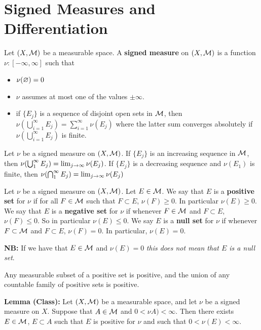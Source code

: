 \newpage
\section{Signed Measures and Differentiation}


\dfn Let $(X, \mathcal{M})$ be a measurable space. A \textbf{signed measure} on $(X, \mathcal{M})$ is a function $\nu: [-\infty, \infty]$ such that
\begin{itemize}
    \item $\nu(\varnothing) = 0$
    \item $\nu$ assumes at most one of the values $\pm\infty$.
    \item if $\{E_j\}$ is a sequence of disjoint open sets in $\mathcal{M}$, then $\nu(\bigcup_{i = 1}^\infty E_j) = \sum_{i = 1}^\infty \nu(E_j)$ where the latter sum converges absolutely if $\nu(\bigcup_{i = 1}^\infty E_j)$ is finite.
\end{itemize}

\vs

\begin{prop}
Let $\nu$ be a signed measure on $(X, \mathcal{M})$. If $\{E_j\}$ is an increasing sequence in $\mathcal{M}$, then $\nu(\bigcup_1^\infty E_j) = \lim_{j\rightarrow \infty} \nu(E_j)$. If $\{E_j\}$ is a decreasing sequence and $\nu(E_1)$ is finite, then $\nu(\bigcap_1^\infty E_j) = \lim_{j \rightarrow \infty} \nu(E_j)$
\end{prop}

\vs

\dfn Let $\nu$ be a signed measure on $(X, \mathcal{M})$. Let $E\in \mathcal{M}$. We say that $E$ is a \textbf{positive set} for $\nu$ if for all $F\in \mathcal{M}$ such that $F\subset E$, $\nu(F) \geq 0$. In particular $\nu(E) \geq 0$. We say that $E$ is a \textbf{negative set} for $\nu$ if whenever $F\in \mathcal{M}$ and $F\subset E$, $\nu(F) \leq 0$. So in particular $\nu(E) \leq 0$. We say $E$ is a \textbf{null set} for $\nu$ if whenever $F\subset \mathcal{M}$ and $F\subset E$, $\nu(F) = 0$. In particular, $\nu(E) = 0$.

\vs

\textbf{NB:} If we have that $E\in \mathcal{M}$ and $\nu(E) = 0$ \textit{this does not mean that $E$ is a null set}.

\vs

\begin{lem}
Any measurable subset of a positive set is positive, and the union of any countable family of positive sets is positive.
\end{lem}

\vs

\textbf{Lemma (Class):} Let $(X, \mathcal{M})$ be a measurable space, and let $\nu$ be a signed measure on $X$. Suppose that $A\in \mathcal{M}$ and $0 < \nu A) < \infty$. Then there exists $E\in \mathcal{M}$, $E\subset A$ such that $E$ is positive for $\nu$ and such that $0 < \nu(E) < \infty$.
\vs

